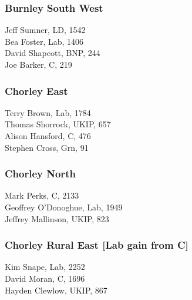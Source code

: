 \documentclass[a4paper,openany,10pt]{book}
\begin{document}
\subsubsection*{Burnley South West}



Jeff Sumner, LD, 1542\\
Bea Foster, Lab, 1406\\
David Shapcott, BNP, 244\\
Joe Barker, C, 219\\


\subsubsection*{Chorley East}



Terry Brown, Lab, 1784\\
Thomas Shorrock, UKIP, 657\\
Alison Hansford, C, 476\\
Stephen Cross, Grn, 91\\


\subsubsection*{Chorley North}



Mark Perks, C, 2133\\
Geoffrey O'Dono\-ghue, Lab, 1949\\
Jeffrey Mallinson, UKIP, 823\\


\subsubsection*{Chorley Rural East \hspace*{\fill}\nolinebreak[1]%
\enspace\hspace*{\fill}
[Lab gain from C]}



Kim Snape, Lab, 2252\\
David Moran, C, 1696\\
Hayden Clewlow, UKIP, 867\\
\end{document}
